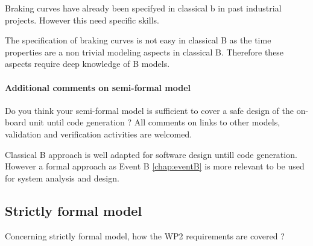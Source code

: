 \begin{author_comment}
Braking curves have already been specifyed in classical b  in past industrial projects. However this need specific skills.
\end{author_comment}


\begin{assessor2}
The specification of braking curves is not easy in classical B as the time properties are a non trivial modeling aspects in classical B. Therefore these aspects require deep knowledge of B models.
\end{assessor2}

\paragraph{Additional comments on semi-formal  model} Do you think your semi-formal  model is sufficient to cover a safe design of the on-board unit until code generation ?
All comments on links to  other models, validation and verification activities are welcomed.



\begin{author_comment}
Classical B  approach is well adapted for software design untill code generation. However a formal approach as Event B \ref{chap:eventB} is more relevant to be used for system analysis and design.
\end{author_comment}


\subsection{Strictly formal model}

Concerning strictly formal model, how the WP2 requirements are covered ?

